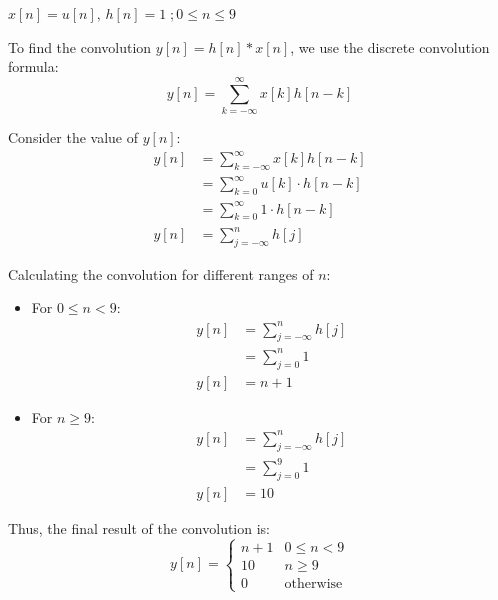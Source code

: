\documentclass[a4paper, 10pt]{article}
\begin{document}
\newpage

\begin{subproblems}[start=2]
    \item \( x[n] = u[n],\, h[n] = 1 \; ; 0 \leq n \leq 9 \)
\end{subproblems}

\begin{solution}
To find the convolution \( y[n] = h[n] * x[n] \), we use the discrete convolution formula:
\[ y[n] = \sum_{k=-\infty}^{\infty} x[k] h[n - k] \]

Consider the value of \( y[n] \):
\begin{align*}
    y[n] &= \sum_{k=-\infty}^{\infty} x[k] h[n - k] \\
    &= \sum_{k=0}^{\infty} u[k] \cdot h[n - k] \\
    &= \sum_{k=0}^{\infty} 1 \cdot h[n - k] \\
    y[n] &= \sum_{j=-\infty}^{n} h[j]
\end{align*}

Calculating the convolution for different ranges of \( n \):
\begin{itemize}
    \item For \( 0 \leq n < 9 \):
    \begin{align*}
        y[n] &= \sum_{j=-\infty}^{n} h[j] \\
        &= \sum_{j=0}^{n} 1 \\
        y[n] &= n + 1
    \end{align*}
    \item For \( n \geq 9 \):
    \begin{align*}
        y[n] &= \sum_{j=-\infty}^{n} h[j] \\
        &= \sum_{j=0}^{9} 1 \\
        y[n] &= 10
    \end{align*}
\end{itemize}

Thus, the final result of the convolution is:
\[ \boxed{
y[n] = \begin{cases}
n + 1 & 0 \leq n < 9 \\
10 & n \geq 9 \\
0 & \text{otherwise}
\end{cases}
} \]
\end{solution}

\newpage
\end{document}
